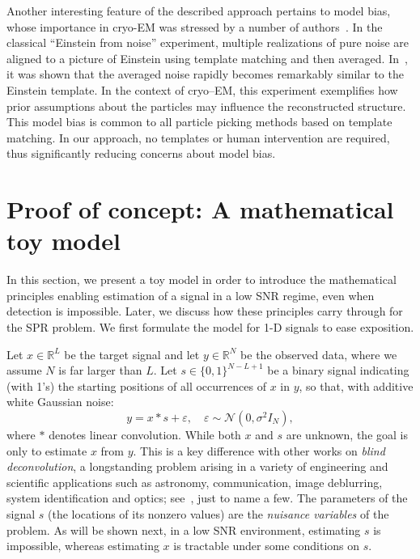 \documentclass[12pt]{article}
\newcommand{\1}{\mathbf{1}}
\newcommand{\RL}{\mathbb{R}^L}
\newcommand{\RN}{\mathbb{R}^N}
\theoremstyle{plain}
\theoremstyle{definition}
\theoremstyle{remark}
\theoremstyle{plain}
\theoremstyle{remark}
\theoremstyle{plain}
\theoremstyle{plain}
\begin{document}
Another interesting feature of the described approach pertains to model bias, whose importance in cryo-EM was stressed by a number of authors~\cite{shatsky2009method,vanheel1992correlation,henderson2013avoiding,vanheel2013finding}. In the classical ``Einstein from noise'' experiment, multiple realizations of pure noise are aligned to a picture of Einstein using template matching and then averaged. In~\cite{shatsky2009method}, it was shown that the averaged noise rapidly becomes remarkably similar to the Einstein template. In the context of cryo--EM, this experiment exemplifies how prior assumptions about the particles may influence the reconstructed structure. This model bias is common to all particle picking methods based on template matching. In our approach, no templates or human intervention are required, thus significantly reducing concerns about model bias. %

\section{Proof of concept: A mathematical toy model}

In this section, we present a toy model in order to introduce the mathematical principles enabling estimation of a signal in a low SNR regime, even when detection is impossible. Later, we discuss how these principles carry through for the SPR problem. We first formulate the model for 1-D signals to ease exposition.

Let $x\in\RL$ be the target signal and let $y\in\RN$ be the observed data, where we assume $N$ is  far larger than $L$. Let  $s \in \{0, 1\}^{N-L+1}$ be a binary signal indicating (with 1's) the starting positions of all occurrences of $x$ in $y$, so that, with additive white Gaussian noise:
\begin{equation}
y  =  x \ast s + \varepsilon, \quad  \varepsilon   \sim \mathcal{N}(0,\sigma^2 I_N),
\label{eq:model}
\end{equation}
where $\ast$ denotes linear convolution. 
While both $x$ and $s$ are unknown, the goal is only to estimate $x$ from $y$.
This is a key difference with other works on  \emph{blind deconvolution}, a longstanding problem arising in a variety of engineering and scientific applications such as astronomy, communication, image deblurring, system identification and optics; see~\cite{jefferies1993restoration,shalvi1990new,ayers1988iterative,abed1997blind}, just to name a few. 
The parameters of the signal $s$ (the locations of its nonzero values) are the \emph{nuisance variables} of the problem. As will be shown next, in a low SNR environment, estimating $s$ is impossible, whereas estimating $x$ is tractable under some conditions on $s$. 
\end{document}
